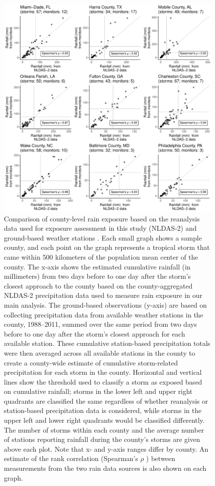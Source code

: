 \documentclass[fleqn,10pt,lineno]{olplainarticle}
\begin{document}
\begin{figure}[tbhp!]
\centering
\includegraphics[width=0.9\linewidth]{figures/raincomparison}
\caption{Comparison of county-level rain exposure based on the reanalysis data used for exposure assessment in this study (NLDAS-2) \cite{rui2013nldas, alhamdan2014environmental} and ground-based weather stations \cite{menne2012overview, rnoaa, countyweather}. Each small graph shows a sample county, and each point on the graph represents a tropical storm that came within 500 kilometers of the population mean center of the county. The x-axis shows the estimated cumulative rainfall (in millimeters) from two days before to one day after the storm's closest approach to the county based on the county-aggregated NLDAS-2 precipitation data used to measure rain exposure in our main analysis. The ground-based observations (y-axis) are based on collecting precipitation data from available weather stations in the county, 1988--2011, summed over the same period from two days before to one day after the storm's closest approach for each available station. These cumulative station-based precipitation totals were then averaged across all available stations in the county to create a county-wide estimate of cumulative storm-related precipitation for each storm in the county. Horizontal and vertical lines show the threshold used to classify a storm as exposed based on cumulative rainfall; storms in the lower left and upper right quadrants are classified the same regardless of whether reanalysis or station-based precipitation data is considered, while storms in the upper left and lower right quadrants would be classified differently. The number of storms within each county and the average number of stations reporting rainfall during the county's storms are given above each plot. Note that x- and y-axis ranges differ by county. An estimate of the rank correlation (Spearman's $\rho$ \cite{spearman1904proof}) between measurements from the two rain data sources is also shown on each graph.}
\label{fig:raincomparison}
\end{figure}
\end{document}
